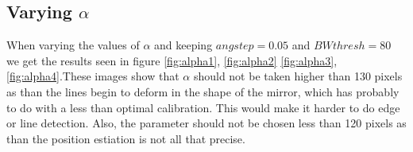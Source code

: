 \documentclass[a4paper, 20pt]{article}
\begin{document}
\begin{figure}[!ht]
\centering
\begin{floatrow}
\end{floatrow}
\end{figure}

\FloatBarrier
\subsection{Varying $\alpha$}
When varying the values of $\alpha$ and keeping $angstep = 0.05$ and $BWthresh=
80$ we get the results seen in figure \ref{fig:alpha1}, \ref{fig:alpha2}
\ref{fig:alpha3}, \ref{fig:alpha4}.These images show that $\alpha$ should not be
taken higher than 130 pixels as than the lines begin to deform in the shape of
the mirror, which has probably to do with a less than optimal calibration. This
would make it harder to do edge or line detection. Also,
the parameter should not be chosen less than 120 pixels as than the position
estiation is not all that precise.
\end{document}
